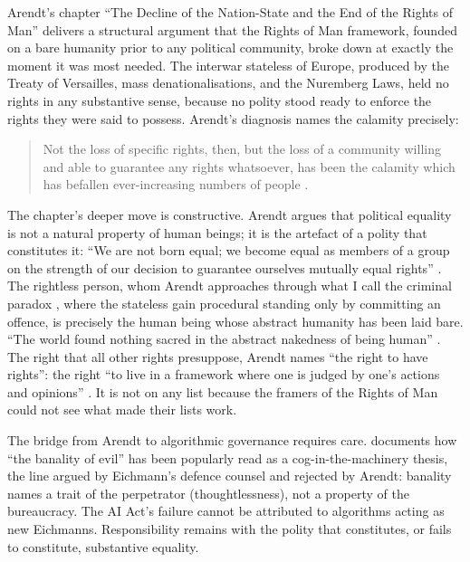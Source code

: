 \documentclass[12pt]{article}
\begin{document}
Arendt's chapter \enquote{The Decline of the Nation-State and the End of the Rights of Man} \citep{arendt1951} delivers a structural argument that the Rights of Man framework, founded on a bare humanity prior to any political community, broke down at exactly the moment it was most needed. The interwar stateless of Europe, produced by the Treaty of Versailles, mass denationalisations, and the Nuremberg Laws, held no rights in any substantive sense, because no polity stood ready to enforce the rights they were said to possess. Arendt's diagnosis names the calamity precisely:

\begin{quote}
\noindent
Not the loss of specific rights, then, but the loss of a community willing and able to guarantee any rights whatsoever, has been the calamity which has befallen ever-increasing numbers of people \citep[p.~296]{arendt1951}.
\end{quote}

The chapter's deeper move is constructive. Arendt argues that political equality is not a natural property of human beings; it is the artefact of a polity that constitutes it: \enquote{We are not born equal; we become equal as members of a group on the strength of our decision to guarantee ourselves mutually equal rights} \citep[p.~301]{arendt1951}. The rightless person, whom Arendt approaches through what I call the criminal paradox \citep[p.~286]{arendt1951}, where the stateless gain procedural standing only by committing an offence, is precisely the human being whose abstract humanity has been laid bare. \enquote{The world found nothing sacred in the abstract nakedness of being human} \citep[p.~299]{arendt1951}. The right that all other rights presuppose, Arendt names \enquote{the right to have rights}: the right \enquote{to live in a framework where one is judged by one's actions and opinions} \citep[p.~296]{arendt1951}. It is not on any list because the framers of the Rights of Man could not see what made their lists work.

The bridge from Arendt to algorithmic governance requires care. \citet{lederman2013} documents how \enquote{the banality of evil} has been popularly read as a cog-in-the-machinery thesis, the line argued by Eichmann's defence counsel and rejected by Arendt: banality names a trait of the perpetrator (thoughtlessness), not a property of the bureaucracy. The AI Act's failure cannot be attributed to algorithms acting as new Eichmanns. Responsibility remains with the polity that constitutes, or fails to constitute, substantive equality.
\end{document}
